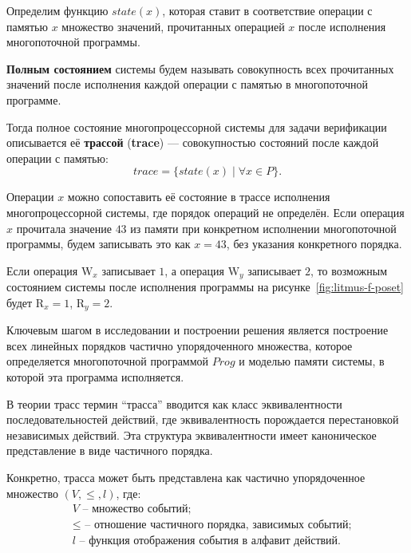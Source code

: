 \begin{definition}
  Определим функцию $state(x)$, которая ставит в соответствие
  операции с памятью $x$ множество значений, прочитанных операцией
  $x$ после исполнения многопоточной программы.
\end{definition}

\begin{definition}
  \textbf{Полным состоянием} системы будем называть совокупность всех
  прочитанных значений после исполнения каждой операции с памятью в
  многопоточной программе.
\end{definition}

Тогда полное состояние многопроцессорной системы для задачи
верификации описывается её \textbf{трассой} (\textbf{trace}) —
совокупностью состояний после каждой операции с памятью:
\[
  trace = \{state(x) \mid \forall x \in P\}.
\]

Операции $x$ можно сопоставить её состояние в трассе исполнения
многопроцессорной системы, где порядок операций не определён. Если
операция $x$ прочитала значение $43$ из памяти при конкретном
исполнении многопоточной программы, будем записывать это как $x =
43$, без указания конкретного порядка.

Если операция $\text{W}_x$ записывает $1$, а операция $\text{W}_y$
записывает $2$, то возможным состоянием системы после исполнения
программы на рисунке~\ref{fig:litmus-f-poset} будет $\text{R}_x = 1$,
$\text{R}_y = 2$.

Ключевым шагом в исследовании и построении решения является
построение всех линейных порядков частично упорядоченного множества,
которое определяется многопоточной программой $Prog$ и моделью памяти
системы, в которой эта программа исполняется.

В теории трасс термин ``трасса'' вводится как класс эквивалентности
последовательностей действий, где эквивалентность порождается
перестановкой независимых действий.
Эта структура эквивалентности имеет каноническое представление в виде
частичного порядка.

Конкретно, трасса может быть представлена как частично
упорядоченное множество $(V, \leq, l)$, где:
\begin{equation}
  \begin{aligned}
    &V \text{ -- множество событий;} \\
    &\leq \text{ -- отношение частичного порядка, зависимых событий;} \\
    &l \text { -- функция отображения события в алфавит действий.}
    \nonumber
  \end{aligned}
  \label{eq:sg_def}
\end{equation}

